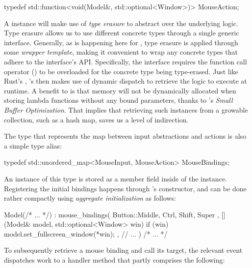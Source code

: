 \begin{cppblock}
  typedef
    std::function<void(Model&, std::optional<Window>)>
    MouseAction;
\end{cppblock}

A  instance will make use of \textit{type erasure}
to abstract over the underlying logic\cite{cppstd, typeerasure}. Type
erasure allows us to use different concrete types through a single
generic interface\cite{typeerasure}. Generally, as is happening here for
, type erasure is applied through some \textit{wrapper
template}, making it convenient to wrap any concrete types that adhere to the
interface's API\cite{typeerasure}. Specifically, the 
interface requires the function call operator () to be
overloaded for the concrete type being type-erased\cite{cppstd, typeerasure}.
Just like Rust's , \cpp{}'s  then makes use
of dynamic dispatch to retrieve the logic to execute at runtime. A benefit to
 is that memory will not be dynamically allocated when
storing lambda functions without any bound parameters, thanks to \cpp{}'s
\textit{Small Buffer Optimization}\cite{commonoptimizations, underhoodfunction}.
That implies that retrieving such instances from a growable collection, such as
a hash map, saves us a level of indirection.

The  type that represents the map between input
abstractions and actions is also a simple type alias:

\begin{cppblock}
  typedef
    std::unordered_map<MouseInput, MouseAction>
    MouseBindings;
\end{cppblock}

An instance of this type is stored as a member field inside of the 
instance. Registering the initial bindings happens through 's
constructor, and can be done rather compactly using \textit{aggregate
initialization} as follows\cite{stdcpp}:

\begin{cppblock}
  Model(/* ... */)
    : mouse_bindings({
      { { Button::Middle, { Ctrl, Shift, Super } },
        [](Model& model, std::optional<Window> win) {
          if (win) model.set_fullscreen_window(*win);
        }
      },
      // ...
    })
  { /* ... */ }
\end{cppblock}

To subsequently retrieve a mouse binding and call its target, the relevant
 event dispatches work to a handler method that partly
comprises the following:

